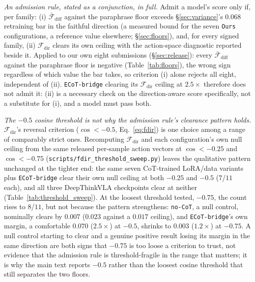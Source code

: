 \emph{An admission rule, stated as a conjunction, in full.} Admit a model's score only if, per family: (i) $\bar{\mathcal{F}}_{\text{diff}}$ against the paraphrase floor exceeds \S\ref{sec:variance}'s $0.068$ retraining bar in the faithful direction (a measured bound for the seven \texttt{Ours} configurations, a reference value elsewhere; \S\ref{sec:floors}), and, for every signed family, (ii) $\mathcal{F}_{\text{dir}}$ clears its own ceiling with the action-space diagnostic reported beside it. Applied to our own eight submissions (\S\ref{sec:release}): every $\bar{\mathcal{F}}_{\text{diff}}$ against the paraphrase floor is negative (Table~\ref{tab:floors}), the wrong sign regardless of which value the bar takes, so criterion (i) alone rejects all eight, independent of (ii). \texttt{ECoT-bridge} clearing its $\mathcal{F}_{\text{dir}}$ ceiling at $2.5\times$ therefore does not admit it: (ii) is a necessary check on the direction-aware score specifically, not a substitute for (i), and a model must pass both.

\emph{The $-0.5$ cosine threshold is not why the admission rule's clearance pattern holds.} $\mathcal{F}_{\text{dir}}$'s reversal criterion ($\cos < -0.5$, Eq.~\ref{eq:fdir}) is one choice among a range of comparably strict ones. Recomputing $\mathcal{F}_{\text{dir}}$ and each configuration's own null ceiling from the same released per-sample action vectors at $\cos < -0.25$ and $\cos < -0.75$ (\texttt{scripts/\allowbreak{}fdir\_threshold\_sweep.py}) leaves the qualitative pattern unchanged at the tighter end: the same seven CoT-trained LoRA/data variants plus \texttt{ECoT-bridge} clear their own null ceiling at both $-0.25$ and $-0.5$ ($7$/$11$ each), and all three DeepThinkVLA checkpoints clear at neither (Table~\ref{tab:threshold_sweep}). At the loosest threshold tested, $-0.75$, the count rises to $8$/$11$, but not because the pattern strengthens: \texttt{no-CoT}, a null control, nominally clears by $0.007$ ($0.023$ against a $0.017$ ceiling), and \texttt{ECoT-bridge}'s own margin, a comfortable $0.070$ ($2.5\times$) at $-0.5$, shrinks to $0.003$ ($1.2\times$) at $-0.75$. A null control starting to clear and a genuine positive result losing its margin in the same direction are both signs that $-0.75$ is too loose a criterion to trust, not evidence that the admission rule is threshold-fragile in the range that matters; it is why the main text reports $-0.5$ rather than the loosest cosine threshold that still separates the two floors.

